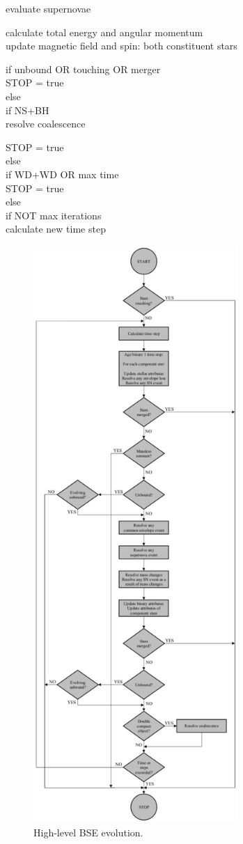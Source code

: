 \tabto{7em}evaluate supernovae

\tabto{7em}calculate total energy and angular momentum \\
\tabto{7em}update magnetic field and spin: both constituent stars

\medskip
\tabto{5em}if unbound OR touching OR merger \\
\tabto{7em}STOP = true \\
\tabto{5em}else \\
\tabto{7em}if NS+BH \\
\tabto{9em}resolve coalescence

\tabto{9em}STOP = true \\
\tabto{7em}else \\
\tabto{9em}if WD+WD OR max time \\
\tabto{11em}STOP = true \\
\tabto{9em}else \\
\tabto{11em}if NOT max iterations \\
\tabto{13em}calculate new time step

\begin{figure}
    \begin{center}
	    \includegraphics[viewport = 0 0 440 1252, width = 7.75cm, clip]{sections/images/BSE_FlowChart.pdf}
    \end{center}
    \vspace{-8.00mm}
    \caption{High-level BSE evolution.}
    \label{fig:BSE_FlowChart}
\end{figure}
